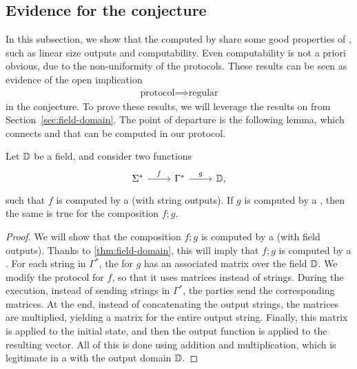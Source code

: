\subsection{Evidence for the conjecture}
\label{sec:continuity}
\AP
In this subsection, we show that the  computed by
 share some  good properties of , such as linear size
outputs and computability. Even computability is not a priori obvious, due to
the non-uniformity of the protocols. These results can be seen as evidence of
the open implication 
\begin{align*}
\text{protocol} \implies \text{regular}
\end{align*}
in the conjecture. To prove these results, we will leverage the results on
 from Section~\ref{sec:field-domain}. The point of
departure is the following lemma, which connects  and
 that can be computed in our protocol.

    \begin{lemma}
        \label{lem:postcomposition-weighted-automaton}
        Let $\mathbb D$ be a field, and consider two functions
        \[
        \begin{tikzcd}
        \Sigma^* 
        \ar[r,"f"]
        &
        \Gamma^*
        \ar[r,"g"]
        & 
        \domain,
        \end{tikzcd}
        \]
        such that $f$ is computed by a  (with string outputs). 
        If $g$  is computed by a , 
        then the same is true for the composition  $f;g$.
    \end{lemma}
    \begin{proof}
      We will show that the composition $f;g$ is computed by a 
      (with field outputs). Thanks to \cref{thm:field-domain}, this will imply
      that $f;g$ is computed by a .
      For each string in $\Gamma^*$, the  for $g$ has an
      associated matrix over the field $\mathbb D$. We modify the protocol for
      $f$, so that it uses matrices instead of strings. During the execution,
      instead of sending strings in $\Gamma^*$, the parties send  the
      corresponding matrices. At the end, instead of concatenating the output
      strings, the matrices are multiplied, yielding a matrix for the entire
      output string. Finally, this matrix is applied to the initial state,
      and then the output function is applied to the resulting vector. All of
      this is done using addition and multiplication, which is legitimate in
      a  with the output domain $\mathbb D$.
    \end{proof}


